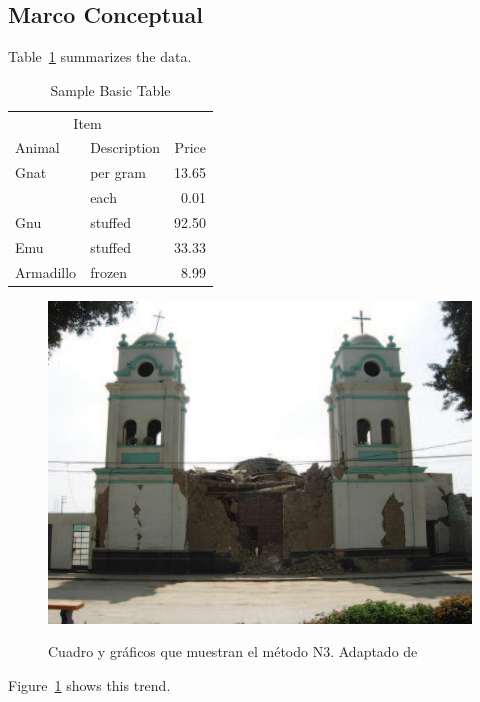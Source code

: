 \subsection{Marco Conceptual}

Table~\ref{tab:BasicTable} summarizes the data. \lipsum[15]

\begin{table}
  \caption{Sample Basic Table}
  \label{tab:BasicTable}
  \begin{tabular}{@{}llr@{}}         \toprule
  \multicolumn{2}{c}{Item}        \\ \cmidrule(r){1-2}
  Animal    & Description & Price \\ \midrule
  Gnat      & per gram    & 13.65 \\
            & each        &  0.01 \\
  Gnu       & stuffed     & 92.50 \\
  Emu       & stuffed     & 33.33 \\
  Armadillo & frozen      &  8.99 \\ \bottomrule
  \end{tabular}
\end{table}

\begin{figure}[ht]
  \caption[Cuadro y gráficos que muestran el método N3]{Cuadro y gráficos que muestran el método N3. Adaptado de \cite{deWaal2009}}
  \includegraphics[scale=0.50]{F_Figures/11_Chapter II/Cap2_Imagen3c.png}
	\label{fig:Figure12}
\end{figure}

Figure~\ref{fig:Figure12} shows this trend. \lipsum[16]